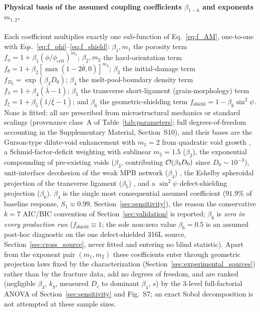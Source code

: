 \paragraph{Physical basis of the assumed coupling coefficients $\beta_{1-6}$ and exponents $m_{1,2}$.} Each coefficient multiplies exactly one sub-function of Eq.~\eqref{eq:f_AM}, one-to-one with Eqs.~\eqref{eq:f_phi}--\eqref{eq:f_shield}: $\beta_1,m_1$ the porosity term $f_\phi=1+\beta_1(\phi/\phi_{\mathrm{crit}})^{m_1}$; $\beta_2,m_2$ the hard-orientation term $f_\theta=1+\beta_2[\max(1-2\bar\theta,0)]^{m_2}$; $\beta_3$ the initial-damage term $f_{D_0}=\exp(\beta_3 D_0)$; $\beta_4$ the melt-pool-boundary density term $f_\lambda=1+\beta_4(\bar\lambda-1)$; $\beta_5$ the transverse short-ligament (grain-morphology) term $f_\xi=1+\beta_5(1/\bar\xi-1)$; and $\beta_6$ the geometric-shielding term $f_{\mathrm{shield}}=1-\beta_6\sin^2\psi$. None is fitted: all are prescribed from microstructural mechanics or standard scalings (provenance class~A of Table~\ref{tab:parameters}; full degrees-of-freedom accounting in the Supplementary Material, Section~S10), and their bases are the Gurson-type dilute-void enhancement with $m_1=2$ from quadratic void growth \cite{gurson1977continuum,tvergaard1984analysis,needleman1987}, a Schmid-factor-deficit weighting with sublinear $m_2=1.5$ ($\beta_2$), the exponential compounding of pre-existing voids ($\beta_3$, contributing ${\cal O}(\beta_3 D_0)$ since $D_0\!\sim\!10^{-3}$), unit-interface decohesion of the weak MPB network ($\beta_4$) \cite{needleman1987,zhang2021modeling}, the Eshelby spheroidal projection of the transverse ligament ($\beta_5$) \cite{eshelby1957}, and a $\sin^2\psi$ defect-shielding projection ($\beta_6$). $\beta_4$ is the single most consequential assumed coefficient ($91.9\%$ of baseline response, $S_1\!\approx\!0.99$, Section~\ref{sec:sensitivity}), the reason the conservative $k=7$ AIC/BIC convention of Section~\ref{sec:validation} is reported; $\beta_6$ is \emph{zero in every production run} ($f_{\mathrm{shield}}\!\equiv\!1$; the sole non-zero value $\beta_6=0.5$ is an assumed post-hoc diagnostic on the one defect-shielded 316L source, Section~\ref{sec:cross_source}, never fitted and entering no blind statistic). Apart from the exponent pair $(m_1,m_2)$ these coefficients enter through geometric projection laws fixed by the characterization (Section~\ref{sec:experimental_sources}) rather than by the fracture data, add no degrees of freedom, and are ranked (negligible $\beta_3$, $k_g$, measured $D_c$ to dominant $\beta_4$, $s$) by the $3$-level full-factorial ANOVA of Section~\ref{sec:sensitivity} and Fig.~S7; an exact Sobol decomposition is not attempted at these sample sizes.

